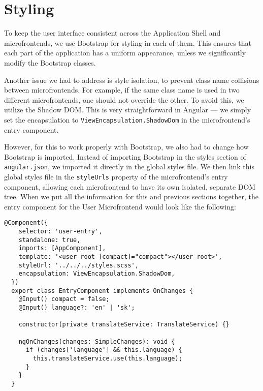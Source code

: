 \section{Styling}
To keep the user interface consistent across the Application Shell and microfrontends, we use Bootstrap for styling in each of them. This ensures that each part of the application has a uniform appearance, unless we significantly modify the Bootstrap classes.

Another issue we had to address is style isolation, to prevent class name collisions between microfrontends. For example, if the same class name is used in two different microfrontends, one should not override the other. To avoid this, we utilize the Shadow DOM. This is very straightforward in Angular — we simply set the encapsulation to \texttt{ViewEncapsulation.ShadowDom} in the microfrontend's entry component.

However, for this to work properly with Bootstrap, we also had to change how Bootstrap is imported. Instead of importing Bootstrap in the styles section of \texttt{angular.json}, we imported it directly in the global styles file. We then link this global styles file in the \texttt{styleUrls} property of the microfrontend's entry component, allowing each microfrontend to have its own isolated, separate DOM tree. When we put all the information for this and previous sections together, the entry component for the User Microfrontend would look like the following:
\begin{lstlisting}[caption={Entry component implementation with Shadow DOM encapsulation and language support for the User Microfrontend}]
  @Component({
    selector: 'user-entry',
    standalone: true,
    imports: [AppComponent],
    template: '<user-root [compact]="compact"></user-root>',
    styleUrl: '../../../styles.scss',
    encapsulation: ViewEncapsulation.ShadowDom,
  })
  export class EntryComponent implements OnChanges {
    @Input() compact = false;
    @Input() language?: 'en' | 'sk';
  
    constructor(private translateService: TranslateService) {}
  
    ngOnChanges(changes: SimpleChanges): void {
      if (changes['language'] && this.language) {
        this.translateService.use(this.language);
      }
    }
  }
\end{lstlisting}